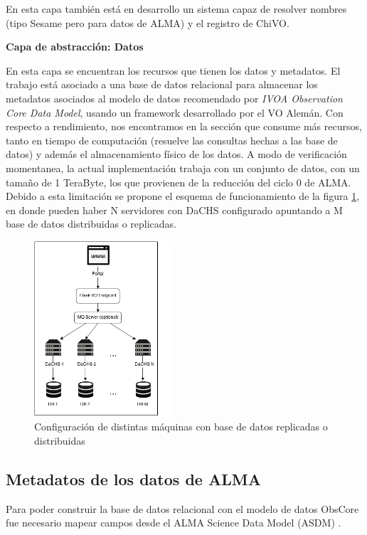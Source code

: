 En esta capa también está en desarrollo un sistema capaz de resolver nombres
(tipo Sesame pero para datos de ALMA) y el registro de ChiVO.

\textbf{Capa de abstracción: Datos}

En esta capa se encuentran los recursos que tienen los datos y metadatos.
El trabajo está asociado a una base de datos relacional para almacenar los
metadatos asociados al modelo de datos recomendado por \emph{IVOA Observation Core
Data Model}, usando un framework desarrollado por el VO Alemán.
Con respecto a rendimiento, nos encontramos en la sección que consume más
recursos, tanto en tiempo de computación (resuelve las consultas hechas a las base
de datos) y además el almacenamiento físico de los datos.
A modo de verificación momentanea,
la actual implementación trabaja con un conjunto de datos, con un tamaño
de 1 TeraByte, los que provienen de la reducción del ciclo 0 de ALMA.
Debido a esta limitación se propone
el esquema de funcionamiento de la figura \ref{fig:dachs}, en donde pueden haber N
servidores con DaCHS configurado apuntando a M base de datos distribuidas o replicadas.

\begin{figure}[ht]
    \centering
    \includegraphics[width=0.45\textwidth]{images/interaccion.png}
    \caption{Configuración de distintas máquinas con base de datos replicadas o distribuidas}
    \label{fig:dachs}
\end{figure}

\subsection{Metadatos de los datos de ALMA}

Para poder construir la base de datos relacional con el modelo de datos ObsCore fue
necesario mapear campos desde el ALMA Science Data Model (ASDM) \cite{viallefond2009sdm}.

